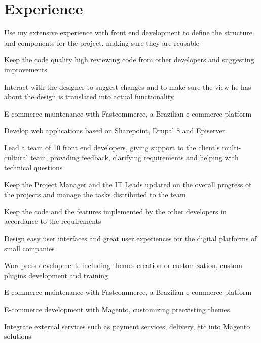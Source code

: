 \documentclass{resumecustom}%
\begin{document}
\begin{minipage}[t]{0.66\textwidth}%
\section{Experience}%
%
%
%
\vspace{\topsep}%
\begin{tightemize}%
\item  Use my extensive experience with front end development to define the structure and components for the project, making sure they are reusable%
\item Keep the code quality high reviewing code from other developers and suggesting improvements%
\item  Interact with the designer to suggest changes and to make sure the view he has about the design is translated into actual functionality%
\item  E-commerce maintenance with Fastcommerce, a Brazilian e-commerce platform%
\end{tightemize}%
\sectionsep%
%
%
%
\vspace{\topsep}%
\begin{tightemize}%
\item Develop web applications based on Sharepoint, Drupal 8 and Episerver%
\item Lead a team of 10 front end developers, giving support to the client's multi-cultural team, providing feedback, clarifying requirements and helping with technical questions%
\item Keep the Project Manager and the IT Leads updated on the overall progress of the projects and manage the tasks distributed to the team%
\item Keep the code and the features implemented by the other developers in accordance to the requirements%
\end{tightemize}%
\sectionsep%
%
%
%
\vspace{\topsep}%
\begin{tightemize}%
\item Design easy user interfaces and great user experiences for the digital platforms of small companies%
\item Wordpress development, including themes creation or customization, custom plugins development and training%
\item E-commerce maintenance with Fastcommerce, a Brazilian e-commerce platform%
\item E-commerce development with Magento, customizing preexisting themes%
\item Integrate external services such as payment services, delivery, etc into Magento solutions%
\end{tightemize}%
\sectionsep%

\end{minipage}
\end{document}

